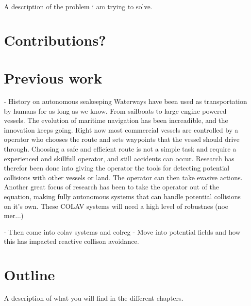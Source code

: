 A description of the problem i am trying to solve. 

\section{Contributions?}

\section{Previous work}
- History on autonomous seakeeping
Waterways have been used as transportation by humans for as long as we know. From sailboats to large engine powered vessels.
The evolution of maritime navigation has been increadible, and the innovation keeps going. Right now most commercial vessels are controlled by a operator who
chooses the route and sets waypoints that the vessel should drive through. Choosing a safe and efficient route is not a simple task and require a experienced and skillfull operator,
and still accidents can occur. Research has therefor been done into giving the operator the tools for detecting potential collisions with other vessels or land. The operator
can then take evasive actions. Another great focus of research has been to take the operator out of the equation, making fully autonomous systems that can handle potential collisions
on it's own. These COLAV systems will need a high level of robustnes (noe mer...)




- Then come into colav systems and colreg
- Move into potential fields and how this has impacted reactive collison avoidance.


\section{Outline}
A description of what you will find in the different chapters. 

\cleardoublepage